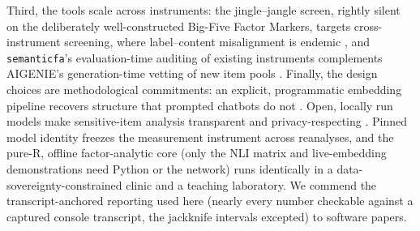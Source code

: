 Third, the tools scale across instruments: the jingle--jangle screen,
rightly silent on the deliberately well-constructed Big-Five Factor
Markers, targets cross-instrument screening, where label--content
misalignment is endemic \citep{wulff-mata-2025,wulff-mata-2026}, and
\texttt{semanticfa}'s evaluation-time auditing of existing instruments
complements AIGENIE's generation-time vetting of new item pools
\citep{russell-lasalandra-etal-2026}. Finally, the design choices are
methodological commitments: an explicit, programmatic embedding pipeline
recovers structure that prompted chatbots do not \citep{huang-etal-2025}.
Open, locally run models make sensitive-item analysis transparent and
privacy-respecting \citep{hussain-etal-2024,low-etal-preprint}. Pinned
model identity freezes the measurement instrument across reanalyses, and
the pure-R, offline factor-analytic core (only the NLI matrix and
live-embedding demonstrations need Python or the network) runs
identically in a data-sovereignty-constrained clinic and a teaching
laboratory. We commend the transcript-anchored reporting used
here (nearly every number checkable against a captured console
transcript, the jackknife intervals excepted) to software papers.
